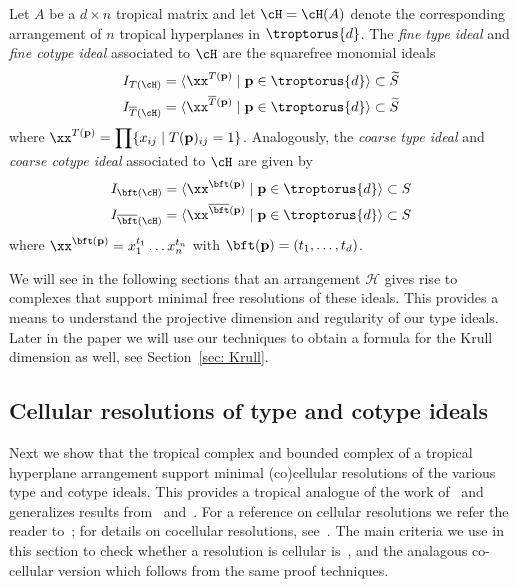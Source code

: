 \begin{definition}\label{def: typeIdeals} Let $A$ be a $d \times n$ tropical matrix and let $\cH = \cH(A)$ denote the corresponding arrangement of $n$ tropical hyperplanes in $\troptorus{d}$. The \emph{fine type ideal} and \emph{fine cotype ideal} associated to $\cH$ are the squarefree monomial ideals
\begin{align*}
I_{T(\cH)} &= \langle \xx^{T({\bf p})}\mid {\bf p}\in \troptorus{d}\rangle \subset \widetilde S\\
I_{\overline{T}(\cH)} &= \langle \xx^{\overline{T}({\bf p})}\mid {\bf p} \in \troptorus{d}\rangle \subset \widetilde S
\end{align*}
where $\xx^{T({\bf p})} = \displaystyle \prod \{x_{ij}\mid T({\bf p})_{ij} = 1\}$. Analogously, the \emph{coarse type ideal} and \emph{coarse cotype ideal} associated to $\cH$ are given by
\begin{align*}
    I_{\bft(\cH)} &= \langle \xx^{\bft({\bf p})}\mid {\bf p}\in \troptorus{d} \rangle \subset S\\
I_{\overline{\bft}(\cH)} &= \langle \xx^{\overline{\bft}({\bf p})}\mid {\bf p}\in \troptorus{d}\rangle \subset S
\end{align*}
where $\xx^{\bft({\bf p})} = x_1^{t_1}\dots x_n^{t_n}$ with $\bft({\bf p}) = (t_1,\dots, t_d)$.
\end{definition}

We will see in the following sections that an arrangement ${\mathcal H}$ gives rise to complexes that support minimal free resolutions of these ideals. This provides a means to understand the projective dimension and regularity of our type ideals.  Later in the paper we will use our techniques to obtain a formula for the Krull dimension as well, see Section~\ref{sec: Krull}. 

\subsection{Cellular resolutions of type and cotype ideals}
Next we show that the tropical complex and bounded complex of a tropical hyperplane arrangement support minimal (co)cellular resolutions of the various type and cotype ideals. This provides a tropical analogue of the work of~\cite{NPS} and generalizes results from~\cite{block2006tropical} and~\cite{dochtermann2012tropical}. 
For a reference on cellular resolutions we refer the reader to~\cite[Chapter 4]{MillerSturmfels:2005}; for details on cocellular resolutions, see~\cite[Section 5.3]{MillerSturmfels:2005}. The main criteria we use in this section to check whether a resolution is cellular is~\cite[Prop. 4.5]{MillerSturmfels:2005}, and the analagous co-cellular version which follows from the same proof techniques.

